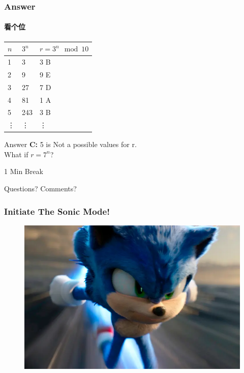 \documentclass[
	11pt, %
]{beamer}
\begin{document}
\begin{frame}
	\frametitle{Answer}
	\framesubtitle{看个位}

		\begin{table}
		\begin{tabular}{l l l}
			\toprule
			\textbf{$n$} & \textbf{$3^n$} & \textbf{$r = 3^n \mod 10$} \\
			\midrule
			1& 3 & 3  \alert{B}\\
			2& 9 & 9 \alert{E}\\
			3& 27 & 7 \alert{D}\\
			4& 81 & 1 \alert{A}\\
			5& 243 & 3 \alert{B}\\
			\vdots &\vdots & \vdots\\
			\bottomrule
		\end{tabular}
	\end{table}

	

\bigskip
Answer \textbf{C: } 5 is Not a possible values for r. \\
What if $r=7^n$?
\end{frame}


\begin{frame}[plain] %
	\begin{center}
		{\Huge 1 Min Break}
		\bigskip\bigskip %
		
		{\LARGE Questions? Comments?}
	\end{center}
\end{frame}


\begin{frame}
\frametitle{Initiate The Sonic Mode!}
		\begin{figure}
			\includegraphics[width=\linewidth]{Sonic.png}
		\end{figure}
\end{frame}
\end{document}
